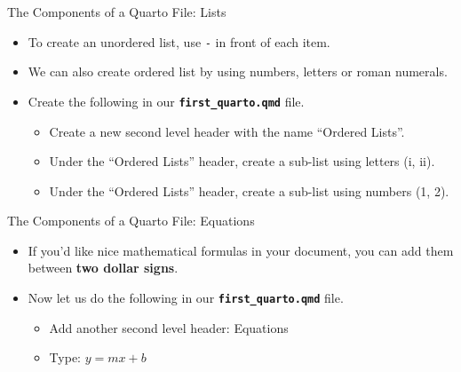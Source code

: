 \documentclass[
  ignorenonframetext,
]{beamer}
\providecommand{\tightlist}{%
  \setlength{\itemsep}{0pt}\setlength{\parskip}{0pt}}
\begin{document}
\begin{frame}[fragile]{The Components of a Quarto File: Lists}
\label{the-components-of-a-quarto-file-lists}
\begin{itemize}
\item
  To create an unordered list, use \texttt{-} in front of each item.
\item
  We can also create ordered list by using numbers, letters or roman
  numerals.
\item
  Create the following in our \textbf{\texttt{first\_quarto.qmd}} file.

  \begin{itemize}
  \tightlist
  \item
    Create a new second level header with the name ``Ordered Lists''.
  \item
    Under the ``Ordered Lists'' header, create a sub-list using letters
    (i, ii).
  \item
    Under the ``Ordered Lists'' header, create a sub-list using numbers
    (1, 2).
  \end{itemize}
\end{itemize}
\end{frame}

\begin{frame}[fragile]{The Components of a Quarto File: Equations}
\label{the-components-of-a-quarto-file-equations}
\begin{itemize}
\item
  If you'd like nice mathematical formulas in your document, you can add
  them between \textbf{two dollar signs}.
\item
  Now let us do the following in our \textbf{\texttt{first\_quarto.qmd}}
  file.

  \begin{itemize}
  \tightlist
  \item
    Add another second level header: Equations
  \item
    Type: \(y = mx + b\)
  \end{itemize}
\end{itemize}
\end{frame}
\end{document}
